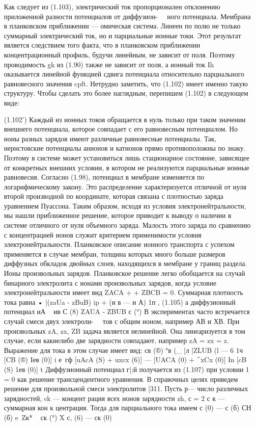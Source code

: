 Как следует из (1.103), электрический ток пропорционален отклонению приложенной разности потенциалов от диффузион- 
ного потенциала. Мембрана в планковском приближении — омическая система. Линеен по полю не только суммарный электрический ток, но и парциальные ионные токи. Этот результат является следствием того факта, что в планковском приближении концентрационный профиль, будучи линейным, не зависит от поля. Поэтому проводимость gk из (1.90) также не зависит от поля, а ионный ток Ih оказывается линейной функцией сдвига потенциала относительно парциального равновесного значения cpft. Нетрудно заметить, что (1.102) имеет именно такую структуру. Чтобы сделать это более наглядным, перепишем (1.102) в следующем виде:
 

(1.102')
Каждый из ионных токов обращается в нуль только при таком значении внешнего потенциала, которое совпадает с его равновесным потенциалом. Но ионы разных зарядов имеют различные равновесные потенциалы. Так, нернстовские потенциалы анионов и катионов прямо противоположны по знаку. Поэтому в системе может установиться лишь стационарное состояние, зависящее от конкретных внешних условии, в котором не реализуются парциальные ионные равновесия.
Согласно (1.98), потенциал в мембране изменяется по логарифмическому закону. Это распределение характеризуется отличной от нуля второй производной по координате, которая связана с плотностью заряда уравнением Пуассона. Таким образом, исходя из условия электронейтральности, мы нашли приближенное решение, которое приводит к выводу о наличии в системе отличного от нуля объемного заряда. Малость этого заряда по сравнению с концентрацией ионов служит критерием применимости условия электронейтральности. Планковское описание ионного транспорта с успехом применяется в случае мембран, толщина которых много больше размеров диффузных обкладок двойных слоев, находящихся в мембране у границ раздела.
Ионы произвольных зарядов. Планковское решение легко обобщается на случай бинарного электролита с ионами произвольных зарядов, когда условие электронейтральности имеет вид ZACA + + ZBCB = 0. Суммарная плотность тока равна
• |(zaUa - zBuB) ip + (и в — и А) 1п	,
(1.105)
а диффузионный потенциал
иА ~ ив	С	(8)
ZAUA - ZBUB с (°)
В экспериментах часто встречается случай смеси двух электроли- 
тов с общим ионом, например АВ и ХВ. При произвольных zA, zx, ZB задача является нелинейной. Она линеаризуется в том случае, если какиелибо две зарядности совпадают, например zA = zx = z. Выражение для тока в этом случае имеет вид:
св (®) °в (_ [л
|ZLUB (l —
6	1ч [CB (®) Iев (0)] i
е~гф [uAcA (S) + uxcx (6)] — [UACA (0) +
^xCx (0)]
In [cB (S) 1ев (0)] t
Диффузионный потенциал г|;й получается из (1.107) при условии 1 = 0 как решение трансцендентного уравнения. В справочных целях приведем решение для произвольной смеси электролитов [311. Пусть р— число различных зарядностей, ck — концент рация всех ионов зарядности zh, с = 2 с к — суммарная кон
к
центрация. Тогда для парциального тока имеем с (0) — с (б) СН (б) e~Zк* ~ ск (°)
X
с, (6)	—	ск	(0) 



